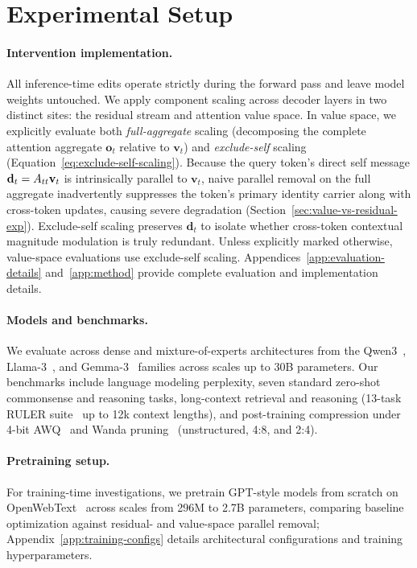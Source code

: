 \section{Experimental Setup}
\label{sec:experiments}
\label{sec:setup}

\paragraph{Intervention implementation.}
All inference-time edits operate strictly during the forward pass and leave
model weights untouched. We apply component scaling across decoder layers in
two distinct sites: the residual stream and attention value space.
In value space, we explicitly evaluate both \textit{full-aggregate} scaling
(decomposing the complete attention aggregate $\mathbf{o}_t$ relative to $\mathbf{v}_t$)
and \textit{exclude-self} scaling (Equation~\ref{eq:exclude-self-scaling}).
Because the query token's direct self message $\mathbf{d}_t = A_{tt}\mathbf{v}_t$
is intrinsically parallel to $\mathbf{v}_t$, naive parallel removal on the full
aggregate inadvertently suppresses the token's primary identity carrier along with
cross-token updates, causing severe degradation (Section~\ref{sec:value-vs-residual-exp}).
Exclude-self scaling preserves $\mathbf{d}_t$ to isolate whether cross-token contextual
magnitude modulation is truly redundant. Unless explicitly marked otherwise,
value-space evaluations use exclude-self scaling.
Appendices~\ref{app:evaluation-details} and~\ref{app:method} provide complete
evaluation and implementation details.

\paragraph{Models and benchmarks.}
We evaluate across dense and mixture-of-experts architectures from the
Qwen3~\citep{Yang2025Qwen3TR}, Llama-3~\citep{Dubey2024TheL3}, and
Gemma-3~\citep{GemmaTeam2025Gemma3} families across scales up to 30B parameters.
Our benchmarks include language modeling perplexity, seven standard zero-shot
commonsense and reasoning tasks, long-context retrieval and reasoning (13-task
RULER suite~\citep{Hsieh2024RULERWT} up to 12k context lengths), and
post-training compression under 4-bit AWQ~\citep{Lin2023AWQAW} and Wanda
pruning~\citep{Sun2023ASA} (unstructured, 4:8, and 2:4).

\paragraph{Pretraining setup.}
For training-time investigations, we pretrain GPT-style models from scratch on
OpenWebText~\citep{Gokaslan2019OpenWeb} across scales from 296M to 2.7B parameters,
comparing baseline optimization against residual- and value-space
parallel removal; Appendix~\ref{app:training-configs} details architectural
configurations and training hyperparameters.

